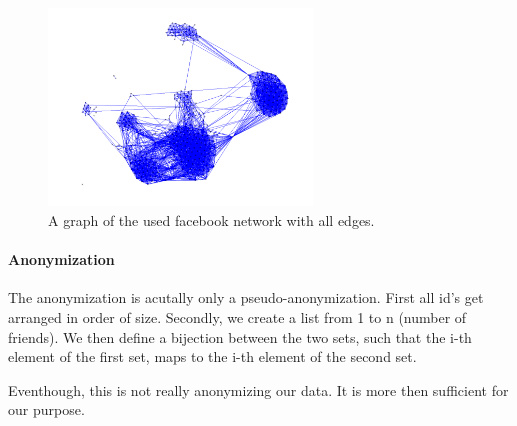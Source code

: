 \begin{figure}
\begin{center}
\includegraphics[width=7cm]{Network-Graph}
\caption{A graph of the used facebook network with all edges.}
\label{Network-Graph}
\end{center}
\end{figure}

\paragraph{Anonymization}

The anonymization is acutally only a pseudo-anonymization. First all id's get arranged in order of size. Secondly, we create a list from 1 to n (number of friends). We then define a bijection between the two sets, such that the i-th element of the first set, maps to the i-th element of the second set. 

Eventhough, this is not really anonymizing our data. It is more then sufficient for our purpose. 




